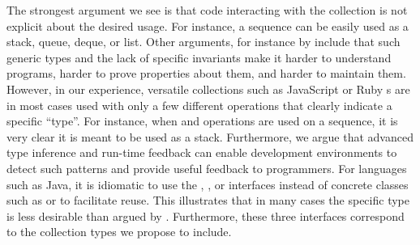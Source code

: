 \documentclass[sigconf, authorversion]{acmart}
\begin{document}
The strongest argument we see is
that code interacting with the collection is not explicit about
the desired usage.
For instance, a sequence can be easily used as a stack, queue, deque, or list.
Other arguments, for instance by \citet{PeytonJones:1996:BTC}
include that such generic types and the lack of specific invariants
make it harder to understand programs, harder to prove properties about them,
and harder to maintain them.
%
However, in our experience, versatile collections
such as JavaScript or Ruby s are in most cases
used with only a few different operations
that clearly indicate a specific ``type''.
For instance, when  and  operations are used on a sequence,
it is very clear it is meant to be used as a stack.
Furthermore, we argue that advanced type inference and run-time feedback
can enable development environments to detect such patterns
and provide useful feedback to programmers.
%
For languages such as Java, it is idiomatic to use the , , or  interfaces instead of concrete classes such as  or  to facilitate reuse.
This illustrates that in many cases the specific type
is less desirable than argued by \citet{PeytonJones:1996:BTC}.
Furthermore, these three interfaces correspond to the collection types we propose to include.
\end{document}

